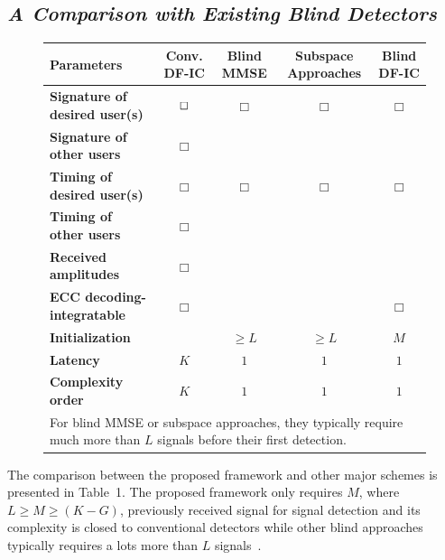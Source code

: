 \documentclass[conference]{IEEEtran}
\begin{document}
\subsection{\em A Comparison with Existing Blind Detectors}
\begin{figure}[t]\label{SchemComp}\small
{}
\begin{center}
\begin{tabular}{lcccc}
Parameters & Conv. DF-IC & Blind MMSE & Subspace Approaches & Blind DF-IC\\
\hline \hline
\textbf{Signature of desired user(s)} & $\bf\Box$ & $\mathbf\Box$ &  $\mathbf\Box$ & $\mathbf\Box$ \\
\textbf{Signature of other users} & $\mathbf\Box$ & &  \\
\textbf{Timing of desired user(s)}  & $\mathbf\Box$ & $\mathbf\Box$ & $\mathbf\Box$ & $\mathbf\Box$ \\
\textbf{Timing of other users}  & $\mathbf\Box$ & & & \\
\textbf{Received amplitudes}  & $\mathbf\Box$ & &  &\\
\textbf{ECC decoding-integratable}& $\mathbf\Box$ &&& $\mathbf\Box$ \\
\textbf{Initialization}~{\small *} &  & $\ge L$ & $\ge L$ & $M$\\
\textbf{Latency} & $K$ & $1$ & $1$ & $1$ \\
\textbf{Complexity order} & $K$ & $1$ & $1$ & $1$ \\
\hline \hline \multicolumn{5}{l}{\tiny * For blind MMSE or
subspace approaches, they typically require much more than $L$
signals before their first detection.}
\end{tabular}
\end{center}
\end{figure}
The comparison between the proposed framework and other major
schemes is presented in Table~1. The proposed framework only
requires $M$, where $L\ge M\ge (K-G)$, previously received signal
for signal detection and its complexity is closed to conventional
detectors while other blind approaches typically requires a lots
more than $L$ signals~\cite{Madh94,Wang98,Zhang02}.
\end{document}
